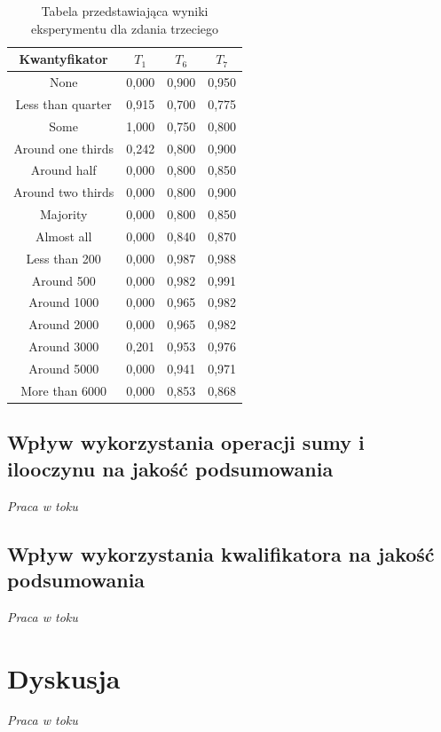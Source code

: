\documentclass{classrep}
\begin{document}
\begin{table}[H]
	\centering
	\begin{tabular}{c c c c} 
		\hline
		\textbf{Kwantyfikator}  & \textbf{$T_1$} & \textbf{$T_6$} & \textbf{$T_7$}\\ [0.5ex] 
		\hline
None	&	0,000	&	0,900	&	0,950	\\
Less than quarter	&	0,915	&	0,700	&	0,775	\\
Some 	&	1,000	&	0,750	&	0,800	\\
Around one thirds 	&	0,242	&	0,800	&	0,900	\\
Around half 	&	0,000	&	0,800	&	0,850	\\
Around two thirds 	&	0,000	&	0,800	&	0,900	\\
Majority 	&	0,000	&	0,800	&	0,850	\\
Almost all	&	0,000	&	0,840	&	0,870	\\
Less than 200	&	0,000	&	0,987	&	0,988	\\
Around 500	&	0,000	&	0,982	&	0,991	\\
Around 1000	&	0,000	&	0,965	&	0,982	\\
Around 2000	&	0,000	&	0,965	&	0,982	\\
Around 3000	&	0,201	&	0,953	&	0,976	\\
Around 5000	&	0,000	&	0,941	&	0,971	\\
More than 6000	&	0,000	&	0,853	&	0,868	\\
		\hline
	\end{tabular}
	\caption{Tabela przedstawiająca wyniki eksperymentu dla zdania trzeciego}
\end{table}

\clearpage



\subsection{Wpływ wykorzystania operacji sumy i ilooczynu na jakość podsumowania}
\textit{Praca w toku}

\subsection{Wpływ wykorzystania kwalifikatora na jakość podsumowania}
\textit{Praca w toku}




\section{Dyskusja}
\textit{Praca w toku}
\end{document}
